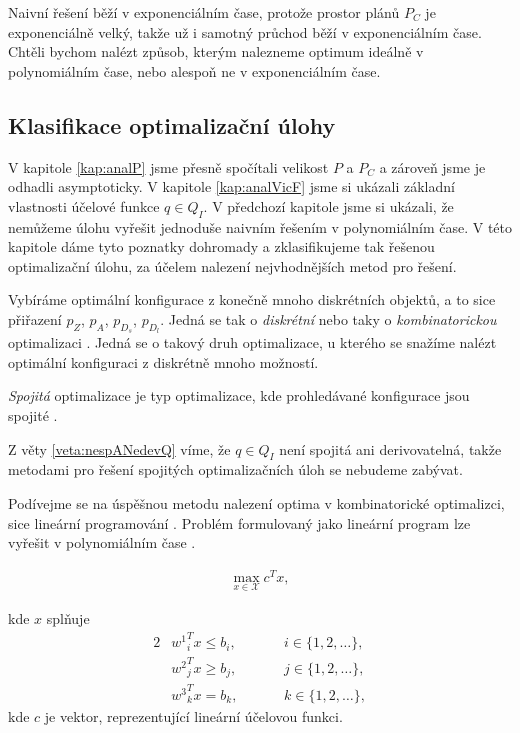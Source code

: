 Naivní řešení běží v exponenciálním čase, protože prostor plánů $P_C$ je exponenciálně velký, takže už i samotný průchod běží v exponenciálním čase.
Chtěli bychom nalézt způsob, kterým nalezneme optimum ideálně v polynomiálním čase, nebo alespoň ne v exponenciálním čase.

\subsection{Klasifikace optimalizační úlohy}\label{kap:NP}

V kapitole \ref{kap:analP} jsme přesně spočítali velikost $P$ a $P_C$ a zároveň jsme je odhadli asymptoticky.
V kapitole \ref{kap:analVicF} jsme si ukázali základní vlastnosti účelové funkce $q \in Q_I$.
V předchozí kapitole jsme si ukázali, že nemůžeme úlohu vyřešit jednoduše naivním řešením v polynomiálním čase.
V této kapitole dáme tyto poznatky dohromady a zklasifikujeme tak řešenou optimalizační úlohu, za účelem nalezení nejvhodnějších metod pro řešení.

Vybíráme optimální konfigurace z konečně mnoho diskrétních objektů, a to sice přiřazení $p_Z$, $p_A$, $p_{D_{s}}$, $p_{D_{l}}$.
Jedná se tak o \textit{diskrétní} nebo taky o \textit{kombinatorickou} optimalizaci \cite{discrete}.
Jedná se o takový druh optimalizace, u kterého se snažíme nalézt optimální konfiguraci z diskrétně mnoho možností.

\textit{Spojitá} optimalizace je typ optimalizace, kde prohledávané konfigurace jsou spojité \cite{continuos}.

Z věty \ref{veta:nespANedevQ} víme, že $q \in Q_I$ není spojitá ani derivovatelná, takže metodami pro řešení spojitých optimalizačních úloh se nebudeme zabývat.

Podívejme se na úspěšnou metodu nalezení optima v kombinatorické optimalizci, sice lineární programování \cite{LP}.
Problém formulovaný jako lineární program lze vyřešit v polynomiálním čase \cite{cohen2020solving}.

\begin{definice}
  \begin{align*}
    \max_{x \in \mathcal{X}} c^T x,
  \end{align*}

  kde $x$ splňuje
  \begin{alignat*}{2}
    & {w^1}^T_i x \leq b_i, && \hspace{20pt} i \in \{ 1, 2, \dots \},\\
    & {w^2}^T_j x \geq b_j, && \hspace{20pt} j \in \{ 1, 2, \dots \},\\
    & {w^3}^T_k x = b_k,    && \hspace{20pt} k \in \{ 1, 2, \dots \},
  \end{alignat*}
  kde $c$ je vektor, reprezentující lineární účelovou funkci.
\end{definice}

